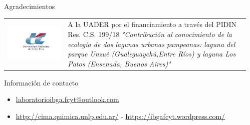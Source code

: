\documentclass[final]{beamer}
\newlength{\sepmargin}
\newlength{\onecolwid}
\begin{document}
\begin{frame}[t]
\begin{columns}[t]
      \begin{column}{\sepmargin} \end{column}
        \begin{column}{\onecolwid} %
			\begin{block}{\large Agradecimientos}
                    \begin{center}
						\begin{tabular}{SL}
							\includegraphics[width=\linewidth]{uader.jpg}  &
							\footnotesize A la UADER por el financiamiento a través del PIDIN Res. C.S. 199/18 \textit{"Contribución al conocimiento de la ecología de dos lagunas urbanas pampeanas: laguna del parque Unzué (Gualeguaychú,Entre Ríos) y laguna Los Patos (Ensenada, Buenos Aires)"}
						\end{tabular}
					\end{center}
				\end{block}	
                \vspace*{-0.9cm}

				\begin{alertblock}{\large Información de contacto}
                \vspace*{-0.5cm}
					\begin{footnotesize}
					\begin{itemize}
						\item \href{mailto:email@meduniwien.ac.at}{laboratorioibga.fcyt@outlook.com}
						\item \href{http://cima.quimica.unlp.edu.ar//}{http://cima.quimica.unlp.edu.ar/} - \href{https://ibgafcyt.wordpress.com}{https://ibgafcyt.wordpress.com/}
					\end{itemize}
					\end{footnotesize}	
					

\end{alertblock}
\end{column}
\end{columns}
\end{frame}
\end{document}
